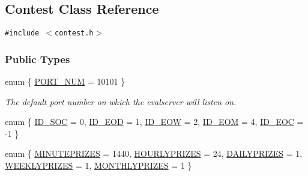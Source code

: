 \hypertarget{classContest}{
\subsection{Contest Class Reference}
\label{classContest}
}
{\tt \#include $<$contest.h$>$}

\subsubsection*{Public Types}
\begin{CompactItemize}
\item 
enum \{ \hyperlink{classContest_Contests11Contests0}{PORT\_\-NUM} =  10101
 \}
\begin{CompactList}\small\item\em The default port number on which the evalserver will listen on.\item\end{CompactList}\item 
enum \{ \hyperlink{classContest_Contests12Contests1}{ID\_\-SOC} =  0, 
\hyperlink{classContest_Contests12Contests2}{ID\_\-EOD} =  1, 
\hyperlink{classContest_Contests12Contests3}{ID\_\-EOW} =  2, 
\hyperlink{classContest_Contests12Contests4}{ID\_\-EOM} =  4, 
\hyperlink{classContest_Contests12Contests5}{ID\_\-EOC} =  -1
 \}
\item 
enum \{ \hyperlink{classContest_Contests13Contests6}{MINUTEPRIZES} =  1440, 
\hyperlink{classContest_Contests13Contests7}{HOURLYPRIZES} =  24, 
\hyperlink{classContest_Contests13Contests8}{DAILYPRIZES} =  1, 
\hyperlink{classContest_Contests13Contests9}{WEEKLYPRIZES} =  1, 
\hyperlink{classContest_Contests13Contests10}{MONTHLYPRIZES} =  1
 \}
\end{CompactItemize}

